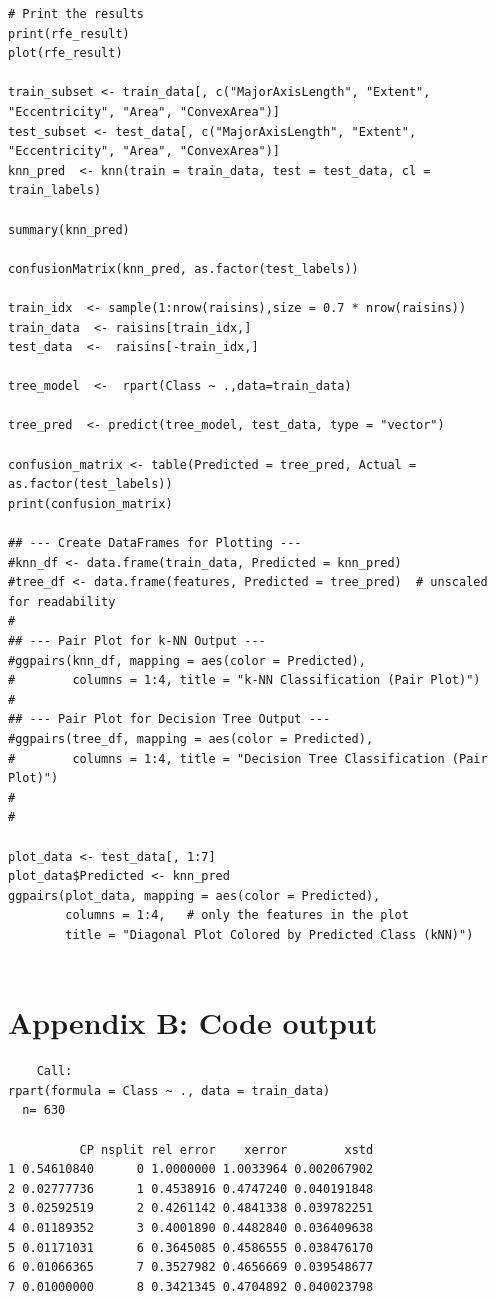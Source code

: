 \documentclass{article}
\begin{document}
\begin{thebibliography}{9}
\begin{verbatim}
# Print the results
print(rfe_result)
plot(rfe_result)

train_subset <- train_data[, c("MajorAxisLength", "Extent", "Eccentricity", "Area", "ConvexArea")]
test_subset <- test_data[, c("MajorAxisLength", "Extent", "Eccentricity", "Area", "ConvexArea")]
knn_pred  <- knn(train = train_data, test = test_data, cl = train_labels)

summary(knn_pred)

confusionMatrix(knn_pred, as.factor(test_labels))

train_idx  <- sample(1:nrow(raisins),size = 0.7 * nrow(raisins))
train_data  <- raisins[train_idx,]
test_data  <-  raisins[-train_idx,]

tree_model  <-  rpart(Class ~ .,data=train_data)

tree_pred  <- predict(tree_model, test_data, type = "vector")

confusion_matrix <- table(Predicted = tree_pred, Actual = as.factor(test_labels))
print(confusion_matrix)

## --- Create DataFrames for Plotting ---
#knn_df <- data.frame(train_data, Predicted = knn_pred)
#tree_df <- data.frame(features, Predicted = tree_pred)  # unscaled for readability
#
## --- Pair Plot for k-NN Output ---
#ggpairs(knn_df, mapping = aes(color = Predicted), 
#        columns = 1:4, title = "k-NN Classification (Pair Plot)")
#
## --- Pair Plot for Decision Tree Output ---
#ggpairs(tree_df, mapping = aes(color = Predicted), 
#        columns = 1:4, title = "Decision Tree Classification (Pair Plot)")
#
#

plot_data <- test_data[, 1:7]
plot_data$Predicted <- knn_pred
ggpairs(plot_data, mapping = aes(color = Predicted),
        columns = 1:4,   # only the features in the plot
        title = "Diagonal Plot Colored by Predicted Class (kNN)")


\end{verbatim}
\newpage
\section{Appendix B: Code output}
\begin{verbatim}
    Call:
rpart(formula = Class ~ ., data = train_data)
  n= 630 

          CP nsplit rel error    xerror        xstd
1 0.54610840      0 1.0000000 1.0033964 0.002067902
2 0.02777736      1 0.4538916 0.4747240 0.040191848
3 0.02592519      2 0.4261142 0.4841338 0.039782251
4 0.01189352      3 0.4001890 0.4482840 0.036409638
5 0.01171031      6 0.3645085 0.4586555 0.038476170
6 0.01066365      7 0.3527982 0.4656669 0.039548677
7 0.01000000      8 0.3421345 0.4704892 0.040023798


\end{verbatim}
\end{thebibliography}
\end{document}
